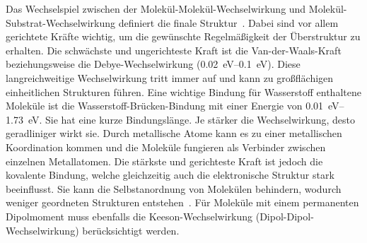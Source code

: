             Das Wechselspiel zwischen der Molekül-Molekül-Wechselwirkung und Molekül-Substrat-Wechselwirkung definiert die finale Struktur~\cite{IF_1}.
            Dabei sind vor allem gerichtete Kräfte wichtig, um die gewünschte Regelmäßigkeit der Überstruktur zu erhalten.
            Die schwächste und ungerichteste Kraft ist die Van-der-Waals-Kraft beziehungsweise die Debye-Wechselwirkung (\SIrange{0.02}{0.1}{\electronvolt}).
            Diese langreichweitige Wechselwirkung tritt immer auf und kann zu großflächigen einheitlichen Strukturen führen.
            Eine wichtige Bindung für Wasserstoff enthaltene Moleküle ist die Wasserstoff-Brücken-Bindung mit einer Energie von \SIrange{0.01}{1.73}{\electronvolt}.
            Sie hat eine kurze Bindungslänge.
            Je stärker die Wechselwirkung, desto geradliniger wirkt sie.
            Durch metallische Atome kann es zu einer metallischen Koordination kommen und die Moleküle fungieren als Verbinder zwischen einzelnen Metallatomen. %
            Die stärkste und gerichteste Kraft ist jedoch die kovalente Bindung, welche gleichzeitig auch die elektronische Struktur stark beeinflusst.
            Sie kann die Selbstanordnung von Molekülen behindern, wodurch weniger geordneten Strukturen entstehen~\cite{IF_1}.
            Für Moleküle mit einem permanenten Dipolmoment muss ebenfalls die Keeson-Wechselwirkung (Dipol-Dipol-Wechselwirkung) berücksichtigt werden.

